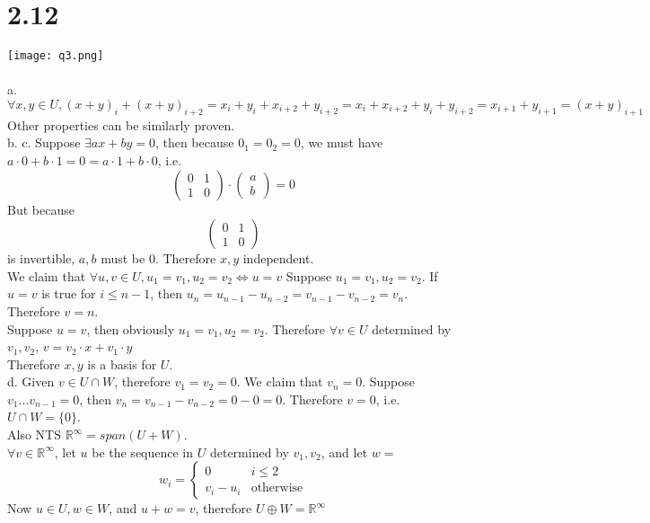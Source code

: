 \documentclass{article}
\begin{document}
\section{2.12}
\texttt{[image: q3.png]}\\\\
a. $\forall x, y \in U, (x+y)_i + (x+y)_{i+2} = x_i + y_i + x_{i+2} + y_{i+2} = x_i + x_{i+2} + y_i + y_{i+2} = x_{i+1} + y_{i+1} = (x+y)_{i+1}$\\
Other properties can be similarly proven.\\
b. c. Suppose $\exists ax + by = 0$, then because $0_1 = 0_2 = 0$, we must have $a\cdot 0 + b \cdot 1 = 0 = a \cdot 1 + b \cdot 0$, i.e.
\begin{equation*}
    \begin{pmatrix}
    0 & 1\\
    1 & 0
    \end{pmatrix} \cdot
    \begin{pmatrix}
    a\\
    b
    \end{pmatrix} = 0
\end{equation*}
But because
\begin{equation*}
    \begin{pmatrix}
    0 & 1\\
    1 & 0
    \end{pmatrix}
\end{equation*}
is invertible, $a, b$ must be $0$. Therefore $x, y$ independent.\\
We claim that $\forall u, v \in U, u_1 = v_1, u_2 = v_2 \Leftrightarrow u = v$
Suppose $u_1 = v_1, u_2 = v_2$. If $u=v$ is true for $i \leq n-1$, then $u_n = u_{n-1} - u_{n-2} = v_{n-1} - v_{n-2} = v_n$. Therefore $v = n$.\\
Suppose $u = v$, then obviously $u_1 = v_1, u_2 = v_2$.
Therefore $\forall v \in U$ determined by $v_1, v_2$, $v = v_2\cdot x + v_1\cdot y$\\
Therefore $x, y$ is a basis for $U$.\\
d. Given $v \in U \cap W$, therefore $v_1 = v_2 = 0$. We claim that $v_n = 0$. Suppose $v_1 ... v_{n-1} = 0$, then $v_n = v_{n-1} - v_{n-2} = 0-0 = 0$. Therefore $v = 0$, i.e. $U \cap W = \{0\}$.\\
Also NTS $\mathbb{R}^{\infty} = span(U + W)$.\\
$\forall v \in \mathbb{R}^{\infty}$, let $u$ be the sequence in $U$ determined by $v_1, v_2$, and let $w=$
\begin{equation*}
    w_i = \begin{cases}
    0 & i \leq 2\\
    v_i - u_i & \textrm{otherwise}
    \end{cases}
\end{equation*}
Now $u \in U, w \in W$, and $u+w = v$, therefore $U \oplus W = \mathbb{R}^{\infty}$
\end{document}
